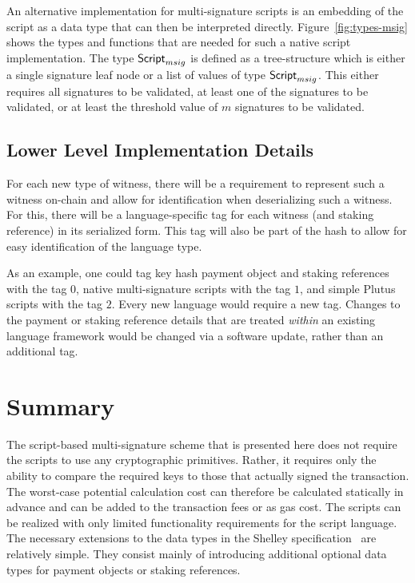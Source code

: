 \documentclass[11pt,a4paper,dvipsnames,twosided]{article}
\newcommand{\khcomment}[1]{\todo[color=blue!20]{KH: #1}}
\newcommand{\Script}{\type{Script}}
\newcommand{\ScriptMSig}{\Script_{msig}}
\theoremstyle{definition}
\begin{document}
An alternative implementation for multi-signature scripts is an embedding of the
script as a data type that can then be interpreted
directly. Figure~\ref{fig:types-msig} shows the types and functions
that are needed for such a native script implementation. The type $\ScriptMSig$ is defined as a
tree-structure which is either a single signature leaf node or a list of values
of type $\ScriptMSig$.  This either requires all signatures to be validated, at
least one of the signatures to be validated, or at least the threshold value of $m$
signatures to be validated.

\subsection{Lower Level Implementation Details}
\label{sec:lower-level-impl}

For each new type of witness, there will be a requirement to represent such a
witness on-chain and allow for identification when deserializing such a
witness. For this, there will be a language-specific tag for each witness (and
staking reference) in its serialized form. This tag will also be part of the
hash to allow for easy identification of the language type.

As an example, one could tag key hash payment object and staking references with
the tag $0$, native multi-signature scripts with the tag $1$, and simple Plutus scripts with the tag
$2$. Every new language would require a new tag. Changes to the payment or staking reference details
that are treated \emph{within} an existing language
framework would be changed via a software update, rather than an additional tag.

\section{Summary}
\label{sec:summary}

The script-based multi-signature scheme that is presented here does not require the scripts
to use any cryptographic primitives. Rather, it requires only the ability to compare the
required keys to those that actually signed the transaction. The worst-case
potential calculation cost can therefore be calculated statically in advance and
can be added to the transaction fees or as gas cost. %
The scripts can be realized
with only limited functionality  requirements for the script language.
%
The necessary extensions to the data types in the Shelley
specification~\cite{shelley_spec} are relatively simple. They consist
mainly of introducing additional optional data types for payment objects or
staking references.
\end{document}

